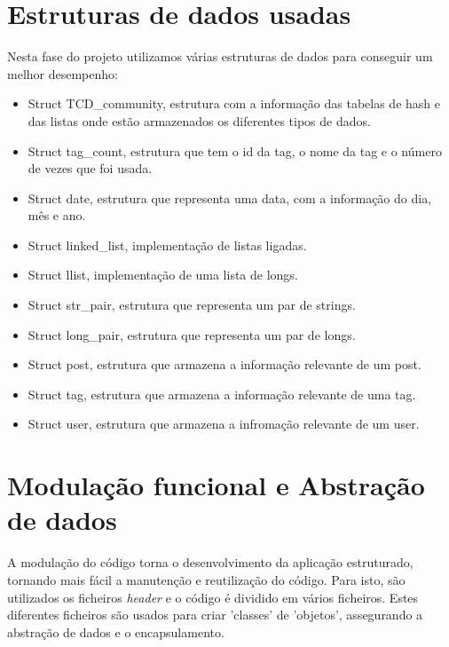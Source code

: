 \documentclass[10pt]{report}
\newcommand\tab[1][0.5cm]{\hspace*{#1}}
\begin{document}
\section{Estruturas de dados usadas}

\tab Nesta fase do projeto utilizamos várias estruturas de dados para conseguir um melhor desempenho:

\begin{itemize}

\item Struct TCD\_community, estrutura com a informação das tabelas de hash e das listas onde estão armazenados os diferentes tipos de dados.

\item Struct tag\_count, estrutura que tem o id da tag, o nome da tag e o número de vezes que foi usada.

\item Struct date, estrutura que representa uma data, com a informação do dia, mês e ano.

\item Struct linked\_list, implementação de listas ligadas.

\item Struct llist, implementação de uma lista de longs.

\item Struct str\_pair, estrutura que representa um par de strings.

\item Struct long\_pair, estrutura que representa um par de longs.

\item Struct post, estrutura que armazena a informação relevante de um post.

\item Struct tag, estrutura que armazena a informação relevante de uma tag.

\item Struct user, estrutura que armazena a infromação relevante de um user.

\end{itemize}

\newpage %

\section{Modulação funcional e Abstração de dados}

\tab A modulação do código torna o desenvolvimento da aplicação estruturado, tornando mais fácil a manutenção e reutilização do código. Para isto, são utilizados os ficheiros \textit{header} e o código é dividido em vários ficheiros. Estes diferentes ficheiros são usados para criar 'classes' de 'objetos', assegurando a abstração de dados e o encapsulamento.
\end{document}
